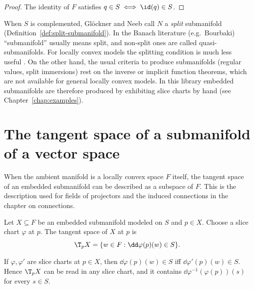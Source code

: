 \begin{proof}
  \leanok
  The identity of $F$ satisfies $q \in S \iff \id(q) \in S$.
\end{proof}

\begin{remark}
  \label{rem:sub-embedded-subtleties}
  When $S$ is complemented, Glöckner and Neeb call $N$ a \emph{split} submanifold
  (Definition~\ref{def:split-submanifold}). In the Banach literature (e.g.\ Bourbaki)
  ``submanifold'' usually means split, and non-split ones are called quasi-submanifolds. For
  locally convex models the splitting condition is much less useful
  \cite[Rem.~3.1.11]{GN26}. On the other hand, the usual criteria to produce submanifolds
  (regular values, split immersions) rest on the inverse or implicit function theorems, which
  are not available for general locally convex models. In this library embedded submanifolds
  are therefore produced by exhibiting slice charts by hand (see Chapter~\ref{chap:examples}).
\end{remark}

\section{The tangent space of a submanifold of a vector space}

When the ambient manifold is a locally convex space $F$ itself, the tangent space of an
embedded submanifold can be described as a subspace of $F$. This is the description used for
fields of projectors and the induced connections in the chapter on connections.

\begin{definition}
  \label{def:tangent-space-submanifold}
  \leanok
  Let $X \subseteq F$ be an embedded submanifold modeled on $S$ and $p \in X$. Choose a slice
  chart $\varphi$ at $p$. The tangent space of $X$ at $p$ is
  \[
    \T_p X = \{ w \in F : \dd\varphi(p)(w) \in S \}.
  \]
\end{definition}

\begin{lemma}
  \label{lem:sub-tangent-chart}
  \leanok
  If $\varphi, \varphi'$ are slice charts at $p \in X$, then $\dd\varphi(p)(w) \in S$ iff
  $\dd\varphi'(p)(w) \in S$. Hence $\T_p X$ can be read in any slice chart, and it contains
  $\dd\varphi^{-1}(\varphi(p))(s)$ for every $s \in S$.
\end{lemma}

